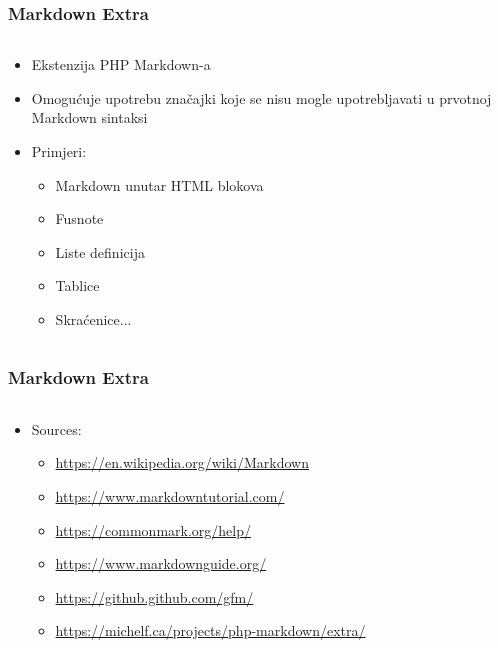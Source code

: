 \documentclass{beamer}
\begin{document}
\begin{frame}
	\frametitle{Markdown Extra}

 	\begin{minipage}[0.2\textheight]{\textwidth}
 	\begin{columns}[T]
 	\begin{column}{0.8\textwidth}
 	\begin{itemize}
 		\item{Ekstenzija PHP Markdown-a}
		\item{Omogućuje upotrebu značajki koje se nisu mogle upotrebljavati u prvotnoj Markdown sintaksi}
		\item{Primjeri: 
		\begin{itemize}
			\item{Markdown unutar HTML blokova}
			\item{Fusnote}
			\item{Liste definicija}
			\item{Tablice}
			\item{Skraćenice}...
		\end{itemize}}
	\end{itemize}
	\end{column}
	\end{columns}
	\end{minipage}

\end{frame}

\begin{frame}
	\frametitle{Markdown Extra}

 	\begin{minipage}[0.2\textheight]{\textwidth}
 	\begin{columns}[T]
 	\begin{column}{0.8\textwidth}
 	\begin{itemize}
 		\item{Sources:
 		\begin{itemize}
 			\item{\url{https://en.wikipedia.org/wiki/Markdown}}
 			\item{\url{https://www.markdowntutorial.com/}}
 			\item{\url{https://commonmark.org/help/}}
 			\item{\url{https://www.markdownguide.org/}}
 			\item{\url{https://github.github.com/gfm/}}
 			\item{\url{https://michelf.ca/projects/php-markdown/extra/}}
 		\end{itemize}}
	\end{itemize}
	\end{column}
	\end{columns}
	\end{minipage}

\end{frame}
\end{document}
